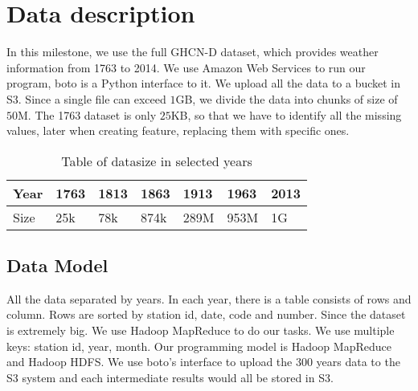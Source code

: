 \section{Data description}
    In this milestone, we use the full GHCN-D\cite{GHCN-D} dataset, which provides weather information from 1763 to 2014. 
    We use Amazon Web Services to run our program, boto\cite{boto} is a Python interface to it. We upload all the data to a bucket in S3\cite{S3}. Since a single file can exceed $1$GB, we divide the data into chunks of size of $50$M.
    The 1763 dataset is only $25$KB, so that we have to identify all the missing values, later when creating feature, replacing them with specific ones.
\begin{table}[htbp]
    \centering
    \caption{Table of datasize in selected years}
    \begin{tabular}{|l|l|l|l|l|l|l|}
        \hline
        Year & 1763 & 1813 & 1863 & 1913 & 1963 & 2013 \\ 
        \hline
        Size & 25k &  78k & 874k & 289M & 953M & 1G \\ 
        \hline 
    \end{tabular}
\end{table}

\subsection{Data Model}
All the data separated by years. In each year, there is a table consists of rows and column. Rows are sorted by station id, date, code and number. Since the dataset is extremely big. We use Hadoop MapReduce to do our tasks. We use multiple keys: station id, year, month. Our programming model is Hadoop MapReduce and Hadoop HDFS. We use boto's interface to upload the 300 years data to the S3 system and each intermediate results would all be stored in S3.
